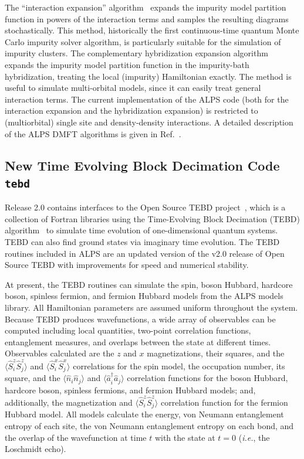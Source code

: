 \documentclass[12pt]{iopart}
\begin{document}
The ``interaction expansion'' algorithm~\cite{Rubtsov04,Rubtsov05} expands the impurity model partition function in powers of the interaction terms and samples the resulting diagrams stochastically. This method, historically
the first continuous-time quantum Monte Carlo impurity solver algorithm, is particularly suitable for the simulation of impurity clusters.
The complementary hybridization expansion algorithm~\cite{Werner06,Werner06Kondo} expands the impurity model partition function in the impurity-bath hybridization, treating 
the local (impurity) Hamiltonian exactly. 
The method is useful to simulate multi-orbital models, since it can easily treat general interaction terms. 
The current implementation of the ALPS code (both for the interaction expansion and the hybridization expansion) is restricted to (multiorbital) single site and density-density interactions.
A detailed description of the ALPS DMFT algorithms is given in Ref.~\cite{ALPSDMFT}.


\subsection{New Time Evolving Block Decimation Code {\tt tebd}}
Release 2.0 contains interfaces to the Open Source TEBD project~\cite{ostebd}, which is a collection of Fortran libraries using the Time-Evolving Block Decimation (TEBD) algorithm~\cite{vidal1, vidal2} to simulate time evolution of one-dimensional quantum systems. TEBD can also find ground states via imaginary time evolution. The TEBD routines included in ALPS are an updated version of the v2.0 release of Open Source TEBD with improvements for speed and numerical stability.

At present, the TEBD routines can simulate the spin, boson Hubbard, hardcore boson, spinless fermion, and fermion Hubbard models from the ALPS models library. All 
Hamiltonian parameters are assumed uniform throughout the system. Because TEBD produces wavefunctions, a wide array of observables can be computed including local quantities, two-point correlation functions, entanglement measures, and overlaps between the state at different times. Observables calculated are the $z$ and $x$ magnetizations, their squares, and the $\langle \hat{S}^z_i 
\hat{S}^z_j\rangle$ and $\langle \hat{S}^x_i \hat{S}^x_j\rangle$ correlations for the spin model, the occupation number, its square, and the $\langle \hat{n}_i \hat{n}_j\rangle$ and 
$\langle \hat{a}_i^{\dagger} \hat{a}_j\rangle$ correlation functions for the boson Hubbard, hardcore boson, spinless fermions, and fermion Hubbard models; and, additionally, 
the magnetization and $\langle \hat{S}^z_i \hat{S}^z_j\rangle$ correlation function for the fermion Hubbard model. All models calculate the energy, von Neumann entanglement 
entropy of each site, the von Neumann entanglement entropy on each bond, and the overlap of the wavefunction at time $t$ with the state at $t=0$ ({\it i.e.}, the Loschmidt echo).
\end{document}
